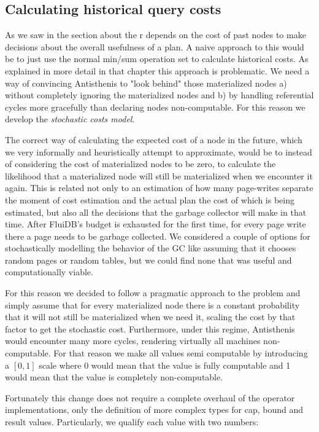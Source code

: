 \subsection{Calculating historical query costs}
\label{sec:historical_cost}


As we saw in the section about the r depends on the cost of past nodes
to make decisions about the overall usefulness of a plan. A naive
approach to this would be to just use the normal min/sum operation set
to calculate historical costs. As explained in more detail in that
chapter this approach is problematic. We need a way of convincing
Antisthenis to "look behind" those materialized nodes a) without
completely ignoring the materialized nodes and b) by handling
referential cycles more gracefully than declaring nodes
non-computable. For this reason we develop the \emph{stochastic costs
  model}.

The correct way of calculating the expected cost of a node in the
future, which we very informally and heuristically attempt to
approximate, would be to instead of considering the cost of
materialized nodes to be zero, to calculate the likelihood that a
materialized node will still be materialized when we encounter it
again. This is related not only to an estimation of how many
page-writes separate the moment of cost estimation and the actual plan
the cost of which is being estimated, but also all the decisions that
the garbage collector will make in that time. After FluiDB's budget is
exhausted for the first time, for every page write there a page needs
to be garbage collected. We considered a couple of options for
stochastically modelling the behavior of the GC like assuming that it
chooses random pages or random tables, but we could find none that was
useful and computationally viable.

For this reason we decided to follow a pragmatic approach to the
problem and simply assume that for every materialized node there is a
constant probability that it will not still be materialized when we
need it, scaling the cost by that factor to get the stochastic
cost. Furthermore, under this regime, Antisthenis would encounter many
more cycles, rendering virtually all machines non-computable. For that
reason we make all values semi computable by introducing a \([0,1]\)
scale where 0 would mean that the value is fully computable and 1
would mean that the value is completely non-computable.

Fortunately this change does not require a complete overhaul of the
operator implementations, only the definition of more complex types
for cap, bound and result values. Particularly, we qualify each value
with two numbers:

